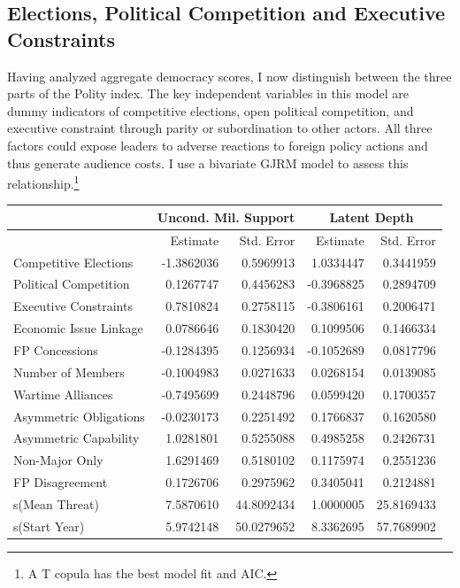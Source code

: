 \documentclass[12pt]{article}
\begin{document}
\subsection{Elections, Political Competition and Executive Constraints} 


Having analyzed aggregate democracy scores, I now distinguish between the three parts of the Polity index. 
The key independent variables in this model are dummy indicators of competitive elections, open political competition, and executive constraint through parity or subordination to other actors. 
All three factors could expose leaders to adverse reactions to foreign policy actions and thus generate audience costs. 
I use a bivariate GJRM model to assess this relationship.\footnote{A T copula has the best model fit and AIC.} 


\begin{table}[ht]
\centering
\begin{tabular}{lrrrr}
 & \multicolumn{2}{c}{Uncond. Mil. Support} & \multicolumn{2}{c}{Latent Depth}\\ \hline
   & Estimate & Std. Error & Estimate & Std. Error \\ 
  \hline 
  Competitive Elections & -1.3862036 & 0.5969913 & 1.0334447 & 0.3441959 \\ 
  Political Competition & 0.1267747 & 0.4456283 & -0.3968825 & 0.2894709 \\ 
  Executive Constraints & 0.7810824 & 0.2758115 & -0.3806161 & 0.2006471 \\ 
  Economic Issue Linkage & 0.0786646 & 0.1830420 & 0.1099506 & 0.1466334 \\ 
  FP Concessions & -0.1284395 & 0.1256934 & -0.1052689 & 0.0817796 \\ 
  Number of Members & -0.1004983 & 0.0271633 & 0.0268154 & 0.0139085 \\ 
  Wartime Alliances & -0.7495699 & 0.2448796 & 0.0599420 & 0.1700357 \\ 
  Asymmetric Obligations & -0.0230173 & 0.2251492 & 0.1766837 & 0.1620580 \\ 
  Asymmetric Capability & 1.0281801 & 0.5255088 & 0.4985258 & 0.2426731 \\ 
  Non-Major Only & 1.6291469 & 0.5180102 & 0.1175974 & 0.2551236 \\ 
  FP Disagreement & 0.1726706 & 0.2975962 & 0.3405041 & 0.2124881 \\ 
  s(Mean Threat) & 7.5870610 & 44.8092434 & 1.0000005 & 25.8169433 \\ 
  s(Start Year) & 5.9742148 & 50.0279652 & 8.3362695 & 57.7689902 \\ 

\end{tabular}
\end{table}
\end{document}
